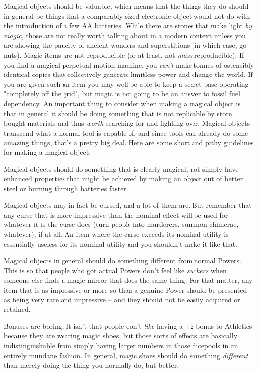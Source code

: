 Magical objects should be valuable, which means that the things they do should in general be things that a comparably sized electronic object would not do with the introduction of a few AA batteries. While there are stones that make light \textit{by magic}, those are not really worth talking about in a modern context unless you are showing the paucity of ancient wonders and superstitions (in which case, go nuts). Magic items are not reproducible (or at least, not \textit{mass} reproducible). If you find a magical perpetual motion machine, you \textit{can't} make tonnes of ostensibly identical copies that collectively generate limitless power and change the world. If you are given such an item you may well be able to keep a secret base operating "completely off the grid", but magic is not going to be an answer to fossil fuel dependency. An important thing to consider when making a magical object is that in general it should be doing something that is not replicable by  store bought materials and thus \textit{worth} searching for and fighting over. Magical objects transcend what a normal tool is capable of, and since tools can already do some amazing things, that's a pretty big deal. Here are some short and pithy guidelines for making a magical object:

\begin{itemize*}
\item Magical objects should do something that is clearly magical, not simply have enhanced properties that might be achieved by making an object out of better steel or burning through batteries faster.
\item Magical objects may in fact be cursed, and a lot of them are. But remember that any curse that is more impressive than the nominal effect will be used for whatever it is the curse does (turn people into murderers, summon chimerae, whatever), if at all. An item where the curse exceeds its nominal utility is essentially useless for its nominal utility and you shouldn't make it like that.
\item Magical objects in general should do something different from normal Powers. This is so that people who got actual Powers don't feel like \textit{suckers} when someone else finds a magic mirror that does the same thing. For that matter, any item that is as impressive or more so than a genuine Power should be presented as being very rare and impressive -- and they should not be easily acquired or retained. 
\item Bonuses are boring. It isn't that people don't \textit{like} having a +2 bonus to Athletics because they are wearing magic shoes, but those sorts of effects are basically indistinguishable from simply having larger numbers in those dicepools in an entirely mundane fashion. In general, magic shoes should do something \textit{different} than merely doing the thing you normally do, but better.
\end{itemize*}

